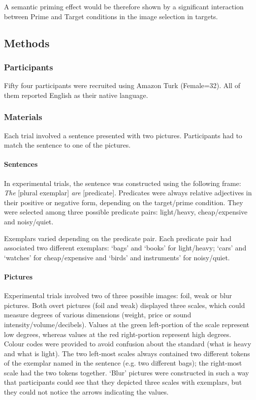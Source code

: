 \documentclass[a4paper]{article}
\begin{document}
A semantic priming effect would be therefore shown by a significant interaction between Prime and Target conditions in the image selection in targets.  

\subsection{Methods}

\subsubsection{Participants}
Fifty four participants were recruited using Amazon Turk (Female=32). All of them reported English as their native language. 

\subsubsection{Materials}
Each trial involved a sentence presented with two pictures. Participants had to match the sentence to one of the pictures.

\paragraph{Sentences}
In experimental trials, the sentence was constructed using the following frame: \textit{The} [plural exemplar] \textit{are} [predicate].
Predicates were always relative adjectives in their positive or negative form, depending on the target/prime condition. They were selected among three possible predicate pairs: light/heavy, cheap/expensive and noisy/quiet. 

\noindent Exemplars varied depending on the predicate pair. Each predicate pair had associated two different exemplars: `bags' and `books' for light/heavy; `cars' and `watches' for cheap/expensive and `birds' and instruments' for noisy/quiet. 

\paragraph{Pictures}
Experimental trials involved two of three possible images: foil, weak or blur pictures. Both overt pictures (foil and weak) displayed three scales, which could measure degrees of various dimensions (weight, price or sound intensity/volume/decibels). Values at the green left-portion of the scale represent low degrees, whereas values at the red right-portion represent high degrees. Colour codes were provided to avoid confusion about the standard (what is heavy and what is light). 
The two left-most scales always contained two different tokens of the exemplar named in the sentence (e.g. two different bags); the right-most scale had the two tokens together. 
`Blur' pictures were constructed in such a way that participants could see that they depicted three scales with exemplars, but they could not notice the arrows indicating the values. 
\end{document}
